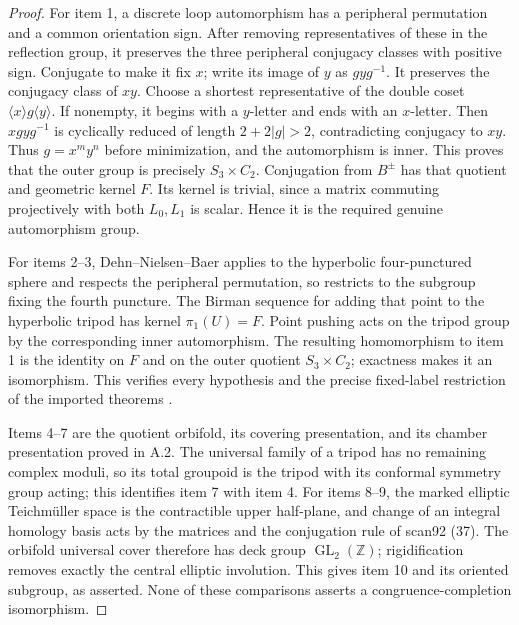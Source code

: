 \begin{proof}
For item 1, a discrete loop automorphism has a peripheral permutation and a common orientation sign. After removing representatives of these in the reflection group, it preserves the three peripheral conjugacy classes with positive sign. Conjugate to make it fix $x$; write its image of $y$ as $g y g^{-1}$. It preserves the conjugacy class of $xy$. Choose a shortest representative of the double coset $\langle x\rangle g\langle y\rangle$. If nonempty, it begins with a $y$-letter and ends with an $x$-letter. Then $xgyg^{-1}$ is cyclically reduced of length $2+2|g|>2$, contradicting conjugacy to $xy$. Thus $g=x^m y^n$ before minimization, and the automorphism is inner. This proves that the outer group is precisely $S_3\times C_2$. Conjugation from $B^\pm$ has that quotient and geometric kernel $F$. Its kernel is trivial, since a matrix commuting projectively with both $L_0,L_1$ is scalar. Hence it is the required genuine automorphism group.

For items 2--3, Dehn--Nielsen--Baer applies to the hyperbolic four-punctured sphere and respects the peripheral permutation, so restricts to the subgroup fixing the fourth puncture. The Birman sequence for adding that point to the hyperbolic tripod has kernel $\pi_1(U)=F$. Point pushing acts on the tripod group by the corresponding inner automorphism. The resulting homomorphism to item 1 is the identity on $F$ and on the outer quotient $S_3\times C_2$; exactness makes it an isomorphism. This verifies every hypothesis and the precise fixed-label restriction of the imported theorems \citep[Theorems 4.6 and 8.8]{FarbMargalit2011dictionary}.

Items 4--7 are the quotient orbifold, its covering presentation, and its chamber presentation proved in A.2. The universal family of a tripod has no remaining complex moduli, so its total groupoid is the tripod with its conformal symmetry group acting; this identifies item 7 with item 4. For items 8--9, the marked elliptic Teichm\"uller space is the contractible upper half-plane, and change of an integral homology basis acts by the matrices and the conjugation rule of scan92 (37). The orbifold universal cover therefore has deck group $\operatorname{GL}_2(\mathbb Z)$; rigidification removes exactly the central elliptic involution. This gives item 10 and its oriented subgroup, as asserted. None of these comparisons asserts a congruence-completion isomorphism.
\end{proof}
